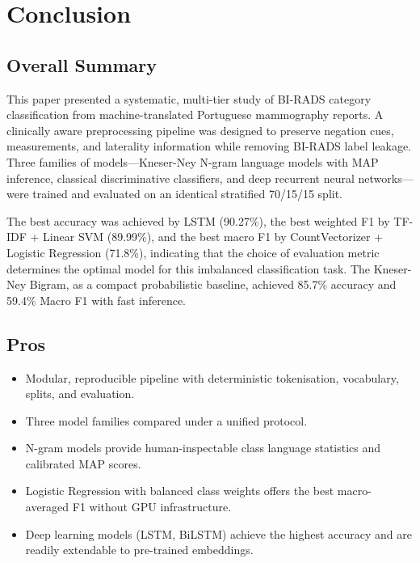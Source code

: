 \documentclass[11pt,a4paper]{article}
\begin{document}
\section{Conclusion}

\subsection{Overall Summary}

This paper presented a systematic, multi-tier study of BI-RADS category
classification from machine-translated Portuguese mammography reports.
A clinically aware preprocessing pipeline was designed to preserve negation
cues, measurements, and laterality information while removing BI-RADS label
leakage.
Three families of models---Kneser-Ney N-gram language models with MAP inference,
classical discriminative classifiers, and deep recurrent neural networks---were
trained and evaluated on an identical stratified 70/15/15 split.

The best accuracy was achieved by LSTM (90.27\%), the best weighted F1 by
TF-IDF + Linear SVM (89.99\%), and the best macro F1 by CountVectorizer +
Logistic Regression (71.8\%), indicating that the choice of evaluation
metric determines the optimal model for this imbalanced classification task.
The Kneser-Ney Bigram, as a compact probabilistic baseline, achieved 85.7\%
accuracy and 59.4\% Macro F1 with fast inference.

\subsection{Pros}

\begin{itemize}
  \item Modular, reproducible pipeline with deterministic tokenisation,
        vocabulary, splits, and evaluation.
  \item Three model families compared under a unified protocol.
  \item N-gram models provide human-inspectable class language statistics
        and calibrated MAP scores.
  \item Logistic Regression with balanced class weights offers the best
        macro-averaged F1 without GPU infrastructure.
  \item Deep learning models (LSTM, BiLSTM) achieve the highest accuracy and
        are readily extendable to pre-trained embeddings.
\end{itemize}
\end{document}
